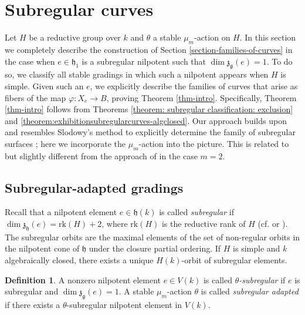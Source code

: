 \documentclass{article} %
\numberwithin{equation}{section}
\theoremstyle{definition}
\newtheorem{definition}[proposition]{Definition}
\newcommand{\frakg}{\mathfrak g}
\newcommand{\frakh}{\mathfrak h}
\newcommand{\frakz}{\mathfrak z}
\begin{document}
\section{Subregular curves}\label{section:subregular curves}

Let $H$ be a reductive group over $k$ and $\theta$ a stable $\mu_m$-action on $H$.
In this section we completely describe the construction of Section \ref{section-families-of-curves} in the case when $e \in \frakh_1$ is a subregular nilpotent such that $\dim \frakz_{\frakg}(e) = 1$. To do so, we classify all stable gradings in which such a nilpotent appears when $H$ is simple. 
Given such an $e$, we explicitly describe the families of curves that arise as fibers of the map $\varphi: X_e \to B$, proving Theorem \ref{thm-intro}.
Specifically, Theorem \ref{thm-intro} follows from Theorems \ref{theorem: subregular classification: exclusion} and \ref{theorem:exhibitionsubregularcurves-algclosed}.
Our approach builds upon and resembles Slodowy's method to explicitly determine the family of subregular surfaces \cite{Slodowy-simplesingularitiesalggroups}; here we incorporate the $\mu_m$-action into the picture.
This is related to but slightly different from the approach of \cite[Section 3]{Thorne-thesis} in the case $m=2$.

\subsection{Subregular-adapted gradings}\label{subsection: subregular adapted gradings}

Recall that a nilpotent element $e\in \frakh(k)$ is called \textit{subregular} if $\dim \frakz_{\frakh}(e) = \mathrm{rk}(H) +2$, where $\mathrm{rk}(H)$ is the reductive rank of $H$ (cf. \cite[Section 5.4]{Slodowy-simplesingularitiesalggroups} or \cite[Section 4.2]{CollingwoodMcGovern-nilpotentorbits}).
The subregular orbits are the maximal elements of the set of non-regular orbits in the nilpotent cone of $\frakh$ under the closure partial ordering.
If $H$ is simple and $k$ algebraically closed, there exists a unique $H(k)$-orbit of subregular elements.


\begin{definition}
   A nonzero nilpotent element $e\in V(k)$ is called \textit{$\theta$-subregular} if $e$ is subregular and $\dim \frakz_{\frakg}(e)=1$.
   A stable $\mu_m$-action $\theta$ is called \emph{subregular adapted} if there exists a $\theta$-subregular nilpotent element in $V(k)$.
\end{definition}
\end{document}
